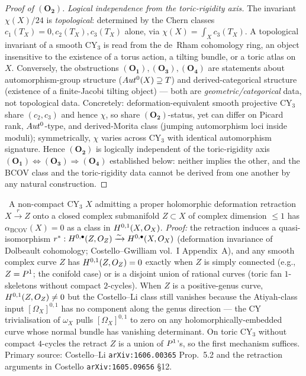 \begin{proof}[Proof of $(\mathbf{O_2})$]
\emph{Logical independence from the toric-rigidity axis.}
The invariant $\chi(X)/24$ is \emph{topological}: determined by the
Chern classes $c_1(T_X) = 0, c_2(T_X), c_3(T_X)$ alone, via
$\chi(X) = \int_X c_3(T_X)$. A topological invariant of a smooth
CY$_3$ is read from the de~Rham cohomology ring, an object
insensitive to the existence of a torus action, a tilting bundle, or
a toric atlas on $X$. Conversely, the obstructions $(\mathbf{O_1}),
(\mathbf{O_3}), (\mathbf{O_4})$ are statements about
automorphism-group structure ($Aut^0(X) \supseteq T$) and
derived-categorical structure (existence of a finite-Jacobi tilting
object) --- both are \emph{geometric/categorical} data, not
topological data. Concretely: deformation-equivalent smooth projective
CY$_3$ share $(c_2, c_3)$ and hence $\chi$, so share
$(\mathbf{O_2})$-status, yet can differ on Picard rank, $Aut^0$-type,
and derived-Morita class (jumping automorphism loci inside moduli);
symmetrically, $\chi$ varies across CY$_3$ with identical
automorphism signature. Hence $(\mathbf{O_2})$ is logically
independent of the toric-rigidity axis $(\mathbf{O_1}) \Leftrightarrow
(\mathbf{O_3}) \Rightarrow (\mathbf{O_4})$ established below: neither
implies the other, and the BCOV class and the toric-rigidity data
cannot be derived from one another by any natural construction.
\end{proof}

\begin{remark}
\label{rem:anomaly-vanishing}
\ClaimStatusProposition\
A non-compact CY$_3$ $X$ admitting a proper holomorphic deformation
retraction $X \xrightarrow{r} Z$ onto a closed complex submanifold
$Z \subset X$ of complex dimension $\leq 1$ has
$\alpha_{\mathrm{BCOV}}(X) = 0$ as a class in $H^{0,1}(X, O_X)$.
\emph{Proof:} the retraction induces a quasi-isomorphism
$r^\ast: H^{0,\bullet}(Z, O_Z) \xrightarrow{\sim}
H^{0,\bullet}(X, O_X)$ (deformation invariance of Dolbeault
cohomology; Costello--Gwilliam vol.~I Appendix~A), and any smooth
complex curve $Z$ has $H^{0,1}(Z, O_Z) = 0$ exactly when $Z$ is
simply connected (e.g., $Z = P^1$; the conifold case) or is a
disjoint union of rational curves (toric fan $1$-skeletons without
compact $2$-cycles). When $Z$ is a positive-genus curve,
$H^{0,1}(Z, O_Z) \neq 0$ but the Costello--Li class still vanishes
because the Atiyah-class input $[\Omega_X]^{0,1}$ has no component
along the genus direction --- the CY trivialisation of $\omega_X$
pulls $[\Omega_X]^{0,1}$ to zero on any holomorphically-embedded
curve whose normal bundle has vanishing determinant. On toric CY$_3$
without compact $4$-cycles the retract $Z$ is a union of $P^1$'s,
so the first mechanism suffices. Primary source: Costello--Li
\texttt{arXiv:1606.00365} Prop.~5.2 and the retraction arguments in
Costello \texttt{arXiv:1605.09656} \S 12.
\end{remark}

